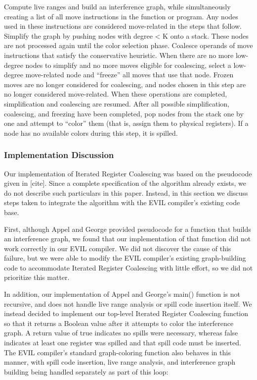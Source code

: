 \documentclass[12pt]{article}
\begin{document}
\begin{multicols}{2}
Compute live ranges and build an interference graph, while simultaneously creating a list of all move instructions in the function or program.
Any nodes used in these instructions are considered move-related in the steps that follow.
Simplify the graph by pushing nodes with degree < K onto a stack.
These nodes are not processed again until the color selection phase.
Coalesce operands of move instructions that satisfy the conservative heuristic.
When there are no more low-degree nodes to simplify and no more moves eligible for coalescing, select a low-degree move-related node and “freeze” all moves that use that node.
Frozen moves are no longer considered for coalescing, and nodes chosen in this step are no longer considered move-related.
When these operations are completed, simplification and coalescing are resumed.
After all possible simplification, coalescing, and freezing have been completed, pop nodes from the stack one by one and attempt to “color” them (that is, assign them to physical registers).
If a node has no available colors during this step, it is spilled.

\subsubsection{Implementation Discussion}
Our implementation of Iterated Register Coalescing was based on the pseudocode given in [cite].
Since a complete specification of the algorithm already exists, we do not describe such particulars in this paper.
Instead, in this section we discuss steps taken to integrate the algorithm with the EVIL compiler’s existing code base.

First, although Appel and George provided pseudocode for a function that builds an interference graph, we found that our implementation of that function did not work correctly in our EVIL compiler.
We did not discover the cause of this failure, but we were able to modify the EVIL compiler’s existing graph-building code to accommodate Iterated Register Coalescing with little effort, so we did not prioritize this matter.

In addition, our implementation of Appel and George’s main() function is not recursive, and does not handle live range analysis or spill code insertion itself.
We instead decided to implement our top-level Iterated Register Coalescing function so that it returns a Boolean value after it attempts to color the interference graph.
A return value of true indicates no spills were necessary, whereas false indicates at least one register was spilled and that spill code must be inserted.
The EVIL compiler’s standard graph-coloring function also behaves in this manner, with spill code insertion, live range analysis, and interference graph building being handled separately as part of this loop:


\end{multicols}
\end{document}

